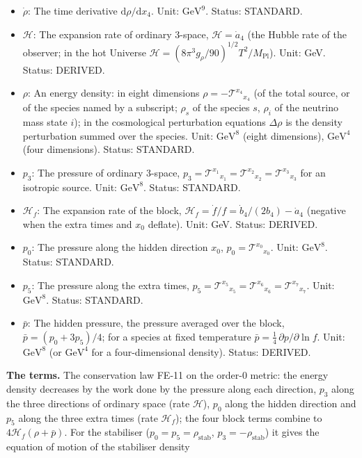 \documentclass[
  10pt,
]{article}
\providecommand{\tightlist}{%
  \setlength{\itemsep}{0pt}\setlength{\parskip}{0pt}}
\begin{document}
\begin{itemize}
\tightlist
\item
  \(\dot\rho\): The time derivative \(\mathrm{d}\rho/\mathrm{d}x_4\).
  Unit: \(\mathrm{GeV}^{9}\). Status: STANDARD.
\item
  \(\mathcal{H}\): The expansion rate of ordinary 3-space,
  \(\mathcal{H} = \dot a_4\) (the Hubble rate of the observer; in the
  hot Universe
  \(\mathcal{H} = (8\pi^3g_\rho/90)^{1/2}T^2/M_{\mathrm{Pl}}\)). Unit:
  GeV. Status: DERIVED.
\item
  \(\rho\): An energy density: in eight dimensions
  \(\rho = -\mathcal{T}^{x_4}{}_{x_4}\) (of the total source, or of the
  species named by a subscript; \(\rho_s\) of the species \(s\),
  \(\rho_i\) of the neutrino mass state \(i\)); in the cosmological
  perturbation equations \(\Delta\rho\) is the density perturbation
  summed over the species. Unit: \(\mathrm{GeV}^{8}\) (eight
  dimensions), \(\mathrm{GeV}^{4}\) (four dimensions). Status: STANDARD.
\item
  \(p_3\): The pressure of ordinary 3-space,
  \(p_3 = \mathcal{T}^{x_1}{}_{x_1} = \mathcal{T}^{x_2}{}_{x_2} = \mathcal{T}^{x_3}{}_{x_3}\)
  for an isotropic source. Unit: \(\mathrm{GeV}^{8}\). Status: STANDARD.
\item
  \(\mathcal{H}_f\): The expansion rate of the block,
  \(\mathcal{H}_f = \dot f/f = \dot b_4/(2b_4) - \dot a_4\) (negative
  when the extra times and \(x_0\) deflate). Unit: GeV. Status: DERIVED.
\item
  \(p_0\): The pressure along the hidden direction \(x_0\),
  \(p_0 = \mathcal{T}^{x_0}{}_{x_0}\). Unit: \(\mathrm{GeV}^{8}\).
  Status: STANDARD.
\item
  \(p_5\): The pressure along the extra times,
  \(p_5 = \mathcal{T}^{x_5}{}_{x_5} = \mathcal{T}^{x_6}{}_{x_6} = \mathcal{T}^{x_7}{}_{x_7}\).
  Unit: \(\mathrm{GeV}^{8}\). Status: STANDARD.
\item
  \(\bar p\): The hidden pressure, the pressure averaged over the block,
  \(\bar p = (p_0 + 3p_5)/4\); for a species at fixed temperature
  \(\bar p = \frac14\,\partial p/\partial\ln f\). Unit:
  \(\mathrm{GeV}^{8}\) (or \(\mathrm{GeV}^{4}\) for a four-dimensional
  density). Status: DERIVED.
\end{itemize}

\textbf{The terms.} The conservation law FE-11 on the order-0 metric:
the energy density decreases by the work done by the pressure along each
direction, \(p_3\) along the three directions of ordinary space (rate
\(\mathcal{H}\)), \(p_0\) along the hidden direction and \(p_5\) along
the three extra times (rate \(\mathcal{H}_f\)); the four block terms
combine to \(4\mathcal{H}_f(\rho + \bar p)\). For the stabiliser
(\(p_0 = p_5 = \rho_{\mathrm{stab}}\), \(p_3 = -\rho_{\mathrm{stab}}\))
it gives the equation of motion of the stabiliser density
\end{document}

